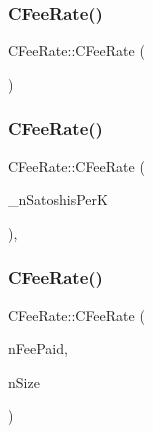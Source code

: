 \subsubsection{\texorpdfstring{C\+Fee\+Rate()}{CFeeRate()}\hspace{0.1cm}{\footnotesize\ttfamily [1/4]}}
{\footnotesize\ttfamily C\+Fee\+Rate\+::\+C\+Fee\+Rate (\begin{DoxyParamCaption}{ }\end{DoxyParamCaption})\hspace{0.3cm}{\ttfamily [inline]}}

\mbox{\label{class_c_fee_rate_abee4364fc0d83612feda7c9f5425a7cc}} 
\subsubsection{\texorpdfstring{C\+Fee\+Rate()}{CFeeRate()}\hspace{0.1cm}{\footnotesize\ttfamily [2/4]}}
{\footnotesize\ttfamily C\+Fee\+Rate\+::\+C\+Fee\+Rate (\begin{DoxyParamCaption}\item[{const \mbox{\hyperlink{amount_8h_a4eaf3a5239714d8c45b851527f7cb564}{C\+Amount}} \&}]{\+\_\+n\+Satoshis\+PerK }\end{DoxyParamCaption})\hspace{0.3cm}{\ttfamily [inline]}, {\ttfamily [explicit]}}

\mbox{\label{class_c_fee_rate_ad92ea084b8fa9495cbfe0da9cfd1cd69}} 
\subsubsection{\texorpdfstring{C\+Fee\+Rate()}{CFeeRate()}\hspace{0.1cm}{\footnotesize\ttfamily [3/4]}}
{\footnotesize\ttfamily C\+Fee\+Rate\+::\+C\+Fee\+Rate (\begin{DoxyParamCaption}\item[{const \mbox{\hyperlink{amount_8h_a4eaf3a5239714d8c45b851527f7cb564}{C\+Amount}} \&}]{n\+Fee\+Paid,  }\item[{size\+\_\+t}]{n\+Size }\end{DoxyParamCaption})}

